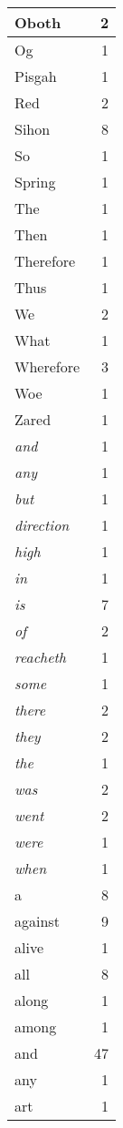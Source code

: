 \begin{center}
\begin{longtable}{l|r}
Oboth & 2 \\ \hline
Og & 1 \\ \hline
Pisgah & 1 \\ \hline
Red & 2 \\ \hline
Sihon & 8 \\ \hline
So & 1 \\ \hline
Spring & 1 \\ \hline
The & 1 \\ \hline
Then & 1 \\ \hline
Therefore & 1 \\ \hline
Thus & 1 \\ \hline
We & 2 \\ \hline
What & 1 \\ \hline
Wherefore & 3 \\ \hline
Woe & 1 \\ \hline
Zared & 1 \\ \hline
\emph{and} & 1 \\ \hline
\emph{any} & 1 \\ \hline
\emph{but} & 1 \\ \hline
\emph{direction} & 1 \\ \hline
\emph{high} & 1 \\ \hline
\emph{in} & 1 \\ \hline
\emph{is} & 7 \\ \hline
\emph{of} & 2 \\ \hline
\emph{reacheth} & 1 \\ \hline
\emph{some} & 1 \\ \hline
\emph{there} & 2 \\ \hline
\emph{they} & 2 \\ \hline
\emph{the} & 1 \\ \hline
\emph{was} & 2 \\ \hline
\emph{went} & 2 \\ \hline
\emph{were} & 1 \\ \hline
\emph{when} & 1 \\ \hline
a & 8 \\ \hline
against & 9 \\ \hline
alive & 1 \\ \hline
all & 8 \\ \hline
along & 1 \\ \hline
among & 1 \\ \hline
and & 47 \\ \hline
any & 1 \\ \hline
art & 1 \\ \hline

\end{longtable}
\end{center}
